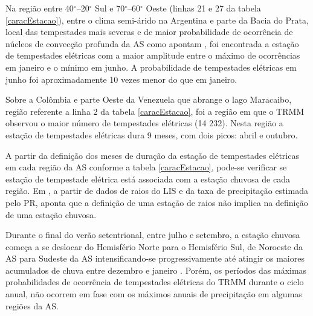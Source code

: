  

Na região entre 40$^{\circ}$--20$^{\circ}$ Sul e 70$^{\circ}$--60$^{\circ}$ Oeste (linhas 21 e 27 da tabela \ref{caracEstacao}),  entre o clima semi-árido na Argentina e parte da Bacia do Prata,  local das tempestades mais severas e de maior probabilidade de ocorrência de núcleos de convecção profunda da AS como apontam , foi encontrada a estação de tempestades elétricas com a maior amplitude entre o máximo de ocorrências em janeiro e o mínimo em junho. A probabilidade de tempestades elétricas em junho foi aproximadamente 10 vezes menor do que em janeiro.

Sobre a Colômbia e parte Oeste da Venezuela que abrange o lago Maracaibo, região referente a linha 2 da tabela \ref{caracEstacao}, foi a região em que o TRMM observou o maior número de tempestades elétricas ({14 232}). Nesta região a estação de tempestades elétricas dura  9 meses, com dois picos: abril e outubro.


A partir da definição dos meses de duração da estação de tempestades elétricas em cada região da AS conforme a tabela \ref{caracEstacao}, pode-se verificar se estação de tempestade elétrica está associada com a estação chuvosa de cada região. Em \cite{cmorales}, a partir de dados de raios do LIS e da taxa de precipitação estimada pelo PR, aponta que a definição de uma estação de raios não implica na definição de uma estação chuvosa. 

Durante o final do verão setentrional, entre julho e setembro, a estação chuvosa começa a se deslocar do Hemisfério Norte para o Hemisfério Sul, de Noroeste da AS para Sudeste da AS intensificando-se progressivamente até atingir os maiores acumulados de chuva entre dezembro e janeiro \cite{grimm2003nino,reboita2010regimes,Marengo2012,shi-atlas,bombardi2008variabilidade,cusdodioTese}. Porém, os períodos 
das máximas probabilidades de ocorrência de tempestades elétricas do TRMM durante o ciclo anual, não ocorrem em fase com os máximos anuais de precipitação em algumas regiões da AS.
 
